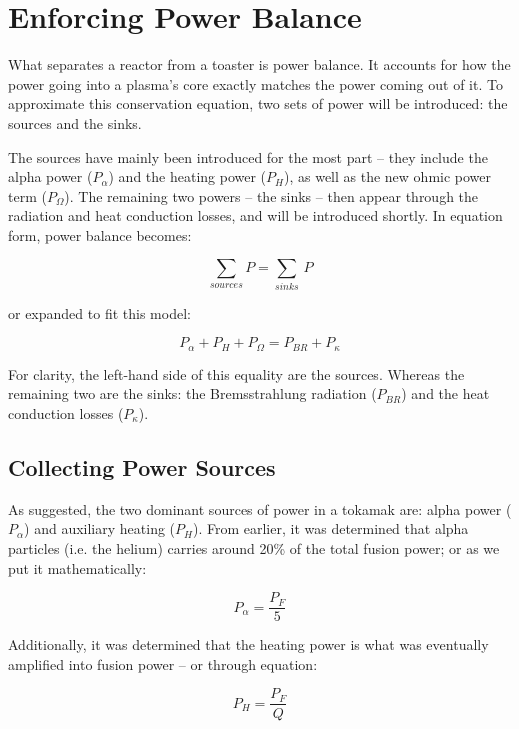 \section{Enforcing Power Balance}

What separates a reactor from a toaster is power balance. It accounts for how the power going into a plasma's core exactly matches the power coming out of it. To approximate this conservation equation, two sets of power will be introduced: the sources and the sinks. 

The sources have mainly been introduced for the most part -- they include the alpha power ($P_\alpha$) and the heating power ($P_H$), as well as the new ohmic power term ($P_\Omega$). The remaining two powers -- the sinks -- then appear through the radiation and heat conduction losses, and will be introduced shortly. In equation form, power balance becomes:

\begin{equation}
	\sum_{sources} P = \sum_{sinks} \, P
\end{equation}

or expanded to fit this model:

\begin{equation}
	\label{eq:power_balance}
	P_\alpha + P_H + P_\Omega = P_{BR} + P_\kappa
\end{equation}

For clarity, the left-hand side of this equality are the sources. Whereas the remaining two are the sinks: the Bremsstrahlung radiation ($P_{BR}$) and the heat conduction losses ($P_\kappa$).

\subsection{Collecting Power Sources}

As suggested, the two dominant sources of power in a tokamak are: alpha power ($P_\alpha$) and auxiliary heating ($P_H$). From earlier, it was determined that alpha particles (i.e. the helium) carries around 20\% of the total fusion power; or as we put it mathematically:

\begin{equation}
	\label{eq:palpha}
	P_\alpha = \frac{P_F}{5}
\end{equation}

Additionally, it was determined that the heating power is what was eventually amplified into fusion power -- or through equation:

\begin{equation}
	\label{eq:ph}
	P_H = \frac{P_F}{Q}
\end{equation}

